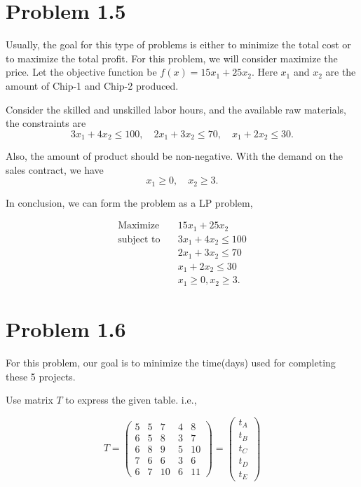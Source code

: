 \documentclass[12pt]{article}
\begin{document}
\section*{Problem 1.5}

Usually, the goal for this type of problems is either to minimize the total cost or to maximize the total profit. For this problem, we will consider maximize the price. Let the objective function be $f(x) = 15x_1 + 25 x_2$. Here $x_1$ and $x_2$ are the amount of Chip-1 and Chip-2 produced.

Consider the skilled and unskilled labor hours, and the available raw materials, the constraints are 
$$
3x_1 + 4x_2 \leqslant 100, \quad 2x_1 + 3x_2 \leqslant 70, \quad x_1 + 2x_2 \leqslant 30.
$$

Also, the amount of product should be non-negative. With the demand on the sales contract, we have
$$
x_1 \geqslant 0, \quad x_2 \geqslant 3.
$$

In conclusion, we can form the problem as a LP problem,

\begin{equation*}
\begin{aligned}
\text{Maximize} \quad & 15x_1 + 25 x_2\\
\text{subject\  to} \quad & 3x_1 + 4x_2 \leqslant 100 \\
&  2x_1 + 3x_2 \leqslant 70 \\
& x_1 + 2x_2 \leqslant 30 \\
& x_1 \geqslant 0, x_2 \geqslant 3.
\end{aligned}
\end{equation*}



\section*{Problem 1.6}

For this problem, our goal is to minimize the time(days) used for completing these 5 projects. 

Use matrix $T$ to express the given table. i.e., 

$$
T = 
\begin{pmatrix}
5 & 5 & 7 & 4 & 8 \\
6 & 5 & 8 & 3 & 7 \\
6 & 8 & 9 & 5 & 10 \\
7 & 6 & 6 & 3 & 6 \\
6 & 7 & 10 & 6 & 11
\end{pmatrix}
 = 
\begin{pmatrix}
t_A \\
t_B \\
t_C \\
t_D \\
t_E
\end{pmatrix}
$$
\end{document}
